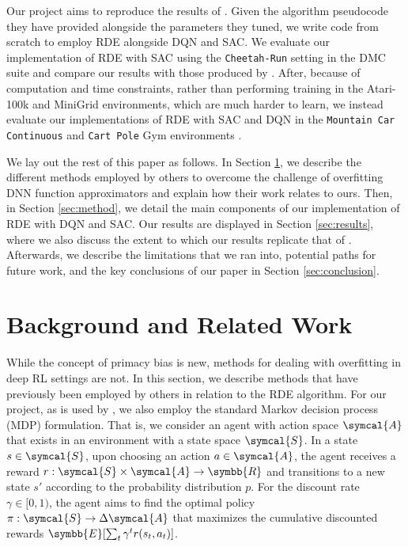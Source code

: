 \documentclass[base]{subfiles}
\begin{document}
Our project aims to reproduce the results of \cite{kim2023}.
Given the algorithm pseudocode they have provided alongside the parameters they tuned, we write code from scratch to employ RDE alongside DQN and SAC.
We evaluate our implementation of RDE with SAC using the \texttt{Cheetah-Run} setting in the DMC suite and compare our results with those produced by \cite{kim2023}.
After, because of computation and time constraints, rather than performing training in the Atari-100k and MiniGrid environments, which are much harder to learn, we instead evaluate our implementations of RDE with SAC and DQN in the \texttt{Mountain Car Continuous} and \texttt{Cart Pole} Gym environments \cite{gym}.

We lay out the rest of this paper as follows.
In Section \ref{sec:related_work}, we describe the different methods employed by others to overcome the challenge of overfitting DNN function approximators and explain how their work relates to ours.
Then, in Section \ref{sec:method}, we detail the main components of our implementation of RDE with DQN and SAC.
Our results are displayed in Section \ref{sec:results}, where we also discuss the extent to which our results replicate that of \cite{kim2023}.
Afterwards, we describe the limitations that we ran into, potential paths for future work, and the key conclusions of our paper in Section \ref{sec:conclusion}.

\section{Background and Related Work}
\label{sec:related_work}

While the concept of primacy bias is new, methods for dealing with overfitting in deep RL settings are not. In this section, we describe methods that have previously been employed by others in relation to the RDE algorithm. For our project, as is used by \cite{kim2023}, we also employ the standard Markov decision process (MDP) formulation.
That is, we consider an agent with action space $\symcal{A}$ that exists in an environment with a state space $\symcal{S}$.
In a state $s \in \symcal{S}$, upon choosing an action $a \in \symcal{A}$, the agent receives a reward $r: \symcal{S} \times \symcal{A} \rightarrow \symbb{R}$ and transitions to a new state $s'$ according to the probability distribution $p$.
For the discount rate $\gamma \in [0,1)$, the agent aims to find the optimal policy $\pi: \symcal{S} \rightarrow \Delta \symcal{A}$ that maximizes the cumulative discounted rewards $\symbb{E} [ \sum_{t} \gamma^t r(s_t, a_t) ]$.
\end{document}
